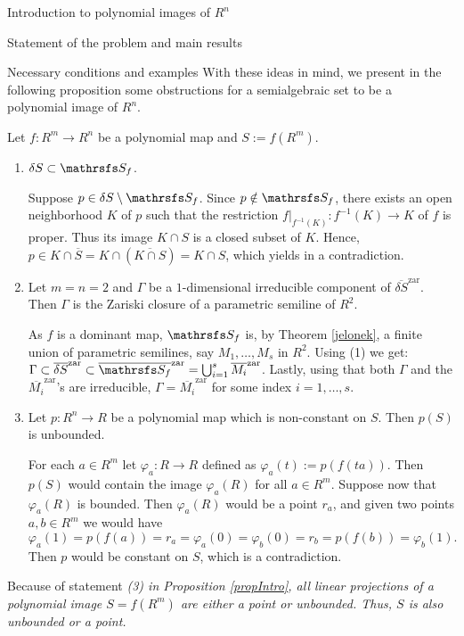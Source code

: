 \documentclass[11pt, a4paper, english, twoside, notitlepage, openright]{report}
\begin{document}
\begin{chapter}{Introduction to polynomial images of $R^n$}
\begin{section}{Statement of the problem and main results}
\begin{subsection}{Necessary conditions and examples}
With these ideas in mind, we present in the following proposition some obstructions for a semialgebraic set to be a polynomial image of $R^n$. 
\begin{proposition}\label{propIntro} Let $f: R^m\to R^n$ be a polynomial map and $S:=f(R^m)$.
\begin{enumerate}[\em(1)\em]
\item $\delta S \subset\S_f$.
\begin{Proof} Suppose $p\in\delta S\setminus \S_f$. Since $p\notin\S_f$, there exists an open neighborhood $K$ of $p$ such that the restriction $f|_{f^{-1}(K)}:f^{-1}(K)\to K$ of $f$ is proper. Thus its image $K\cap S$ is a closed subset of $K$. Hence, $p\in K\cap\overline{S}=K\cap(\overline{K\cap S})=K\cap S$, which yields in a contradiction.
\end{Proof}
\item Let $m=n=2$ and $\Gamma$ be a $1$-dimensional irreducible component of $\overline{\delta S}^{\text{zar}}$. Then $\Gamma$ is the Zariski closure of a parametric semiline of $R^2$.
\begin{Proof} As $f$ is a dominant map, $\S_f$ is, by Theorem \ref{jelonek}, a finite union of parametric semilines, say $M_1,\dots, M_s$ in $R^2$. Using (1) we get: $\Gamma\subset\overline{\delta S}^{\text{zar}}\subset \overline{\S_f}^{\text{zar}}=\bigcup_{i=1}^s\overline{M_i}^{\text{zar}}$. Lastly, using that both $\Gamma$ and the $\overline{M_i}^{\text{zar}}$'s are irreducible, $\Gamma=\overline{M_i}^{\text{zar}}$ for some index $i=1,\dots,s$.
\end{Proof}
\item Let $p:R^n\to R$ be a polynomial map which is non-constant on $S$. Then $p(S)$ is unbounded.
\begin{Proof} For each $a \in R^m$ let $\varphi_a:R\to R$ defined as $\varphi_a(t):=p(f(ta))$. Then $p(S)$ would contain the image $\varphi_a(R)$ for all $a\in R^m$. Suppose now that $\varphi_a(R)$ is bounded. Then $\varphi_a(R)$ would be a point $r_a$, and given two points $a,b\in R^m$ we would have
$$ 
\varphi_a(1)=p(f(a))=r_a=\varphi_a(0)=\varphi_b(0)=r_b=p(f(b))=\varphi_b(1).
$$ 
Then $p$ would be constant on $S$, which is a contradiction.
\end{Proof}
\end{enumerate}
\end{proposition}	
\begin{corollary} Because of statement \em (3) \em in Proposition \em \ref{propIntro}, \em all linear projections of a polynomial image $S=f(R^m)$ are either a point or unbounded. Thus, $S$ is also unbounded or a point.
\end{corollary}
	

\end{subsection}
\end{section}
\end{chapter}
\end{document}
